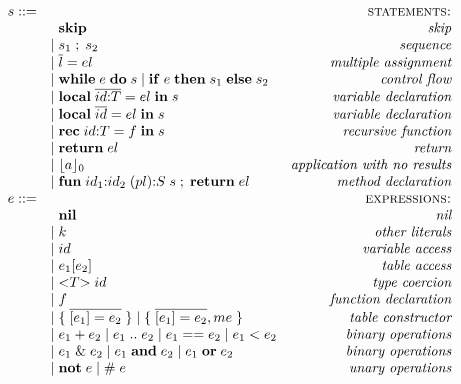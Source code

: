 \documentclass[preprint]{sigplanconf}
\begin{document}
\begin{figure*}[!ht]
	$$
	\begin{array}{rlr}
	s ::= & & \textsc{statements:}\\
	& \;\; \mathbf{skip} & \textit{skip}\\
	& | \; s_{1} \; ; \; s_{2} & \textit{sequence}\\
	& | \; \overline{l} = el & \textit{multiple assignment}\\
	& | \; \mathbf{while} \; e \; \mathbf{do} \; s \;
	| \; \mathbf{if} \; e \; \mathbf{then} \; s_{1} \; \mathbf{else} \; s_{2} & \textit{control flow}\\
	& | \; \mathbf{local} \; \overline{id{:}T} = el \; \mathbf{in} \; s & \textit{variable declaration}\\
	& | \; \mathbf{local} \; \overline{id} = el \; \mathbf{in} \; s & \textit{variable declaration}\\
	& | \; \mathbf{rec} \; id{:}T = f \; \mathbf{in} \; s & \textit{recursive function} \\
	& | \; \mathbf{return} \; el & \textit{return} \\
	& | \; \lfloor a \rfloor_{0} & \textit{application with no results}\\
	& | \; \mathbf{fun} \; id_{1}{:}id_{2} \; (pl){:}S \; s \;;\; \mathbf{return} \; el & \textit{method declaration}\\
	e ::= & & \textsc{expressions:}\\
	& \;\; \mathbf{nil} & \textit{nil}\\
	& | \; k & \textit{other literals}\\
	& | \; id & \textit{variable access}\\
	& | \; e_{1}[e_{2}] & \textit{table access}\\
	& | \; {<}T{>} \; id & \textit{type coercion}\\
	& | \; f & \textit{function declaration}\\
	& | \; \{ \; \overline{[e_{1}] = e_{2}} \; \} \;
	| \; \{ \; \overline{[e_{1}] = e_{2}},me \; \} & \textit{table constructor}\\
	& | \; e_{1} + e_{2} \;
	| \; e_{1} \; {..} \; e_{2} \;
	| \; e_{1} == e_{2} \;
	| \; e_{1} < e_{2} & \textit{binary operations}\\
	& | \; e_{1} \;\&\; e_{2} \;
	| \; e_{1} \; \mathbf{and} \; e_{2} \;
	| \; e_{1} \; \mathbf{or} \; e_{2} & \textit{binary operations}\\
	& | \; \mathbf{not} \; e \;
	| \; \# \; e & \textit{unary operations} \\

\end{array}$$
\end{figure*}
\end{document}
